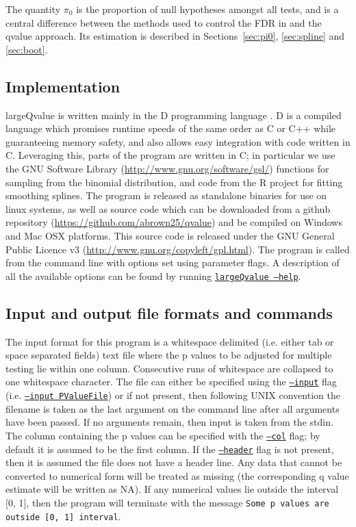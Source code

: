 \documentclass{amsart}
\begin{document}
The quantity $\pi_0$ is the proportion of null hypotheses amongst all tests, and is a central difference between the methods used to control the FDR in \citet{fdr} and the qvalue approach. Its estimation is described in Sections~\ref{sec:pi0}, \ref{sec:spline} and \ref{sec:boot}.

\subsection{Implementation}

largeQvalue is written mainly in the D programming language \citep{dlang}. D is a compiled language which promises runtime speeds of the same order as C or C++ while guaranteeing memory safety, and also allows easy integration with code written in C. Leveraging this, parts of the program are written in C; in particular we use the GNU Software Library (\url{http://www.gnu.org/software/gsl/}) functions for sampling from the binomial distribution, and code from the R project \citep{R} for fitting smoothing splines. The program is released as standalone binaries for use on linux systems, as well as source code which can be downloaded from a github repository (\url{https://github.com/abrown25/qvalue}) and be compiled on Windows and Mac OSX platforms. This source code is released under the GNU General Public Licence v3 (\url{http://www.gnu.org/copyleft/gpl.html}). The program is called from the command line with options set using parameter flags. A description of all the available options can be found by running \underline{\texttt{largeQvalue --help}}.

\subsection{Input and output file formats and commands}

The input format for this program is a whitespace delimited (i.e. either tab or space separated fields) text file where the p values to be adjusted for multiple testing lie within one column. Consecutive runs of whitespace are collapsed to one whitespace character. The file can either be specified using the \underline{\texttt{--input}} flag (i.e. \underline{\texttt{--input PValueFile}}) or if not present, then following UNIX convention the filename is taken as the last argument on the command line after all arguments have been passed. If no arguments remain, then input is taken from the stdin. The column containing the p values can be specified with the \underline{\texttt{--col}} flag; by default it is assumed to be the first column. If the \underline{\texttt{--header}} flag is not present, then it is assumed the file does not have a header line. Any data that cannot be converted to numerical form will be treated as missing (the corresponding q value estimate will be written as NA). If any numerical values lie outside the interval [0, 1], then the program will terminate with the message \texttt{Some p values are outside [0, 1] interval}.
\end{document}
